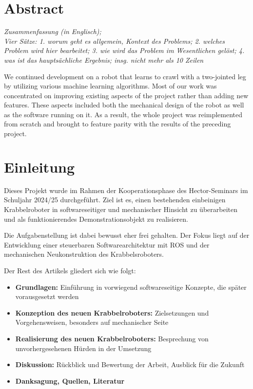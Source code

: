 \section*{Abstract}

\textit{Zusammenfassung (in Englisch); \\ Vier Sätze: 1. worum geht es allgemein, Kontext des Problems; 2. welches Problem wird hier bearbeitet; 3. wie wird das Problem im Wesentlichen gelöst; 4. was ist das hauptsächliche Ergebnis; insg. nicht mehr als 10 Zeilen}

We continued development on a robot that learns to crawl with a two-jointed leg by utilizing various machine learning algorithms. Most of our work was concentrated on improving existing aspects of the project rather than adding new features. These aspects included both the mechanical design of the robot as well as the software running on it. As a result, the whole project was reimplemented from scratch and brought to feature parity with the results of the preceding project.

\section{Einleitung}

Dieses Projekt wurde im Rahmen der Kooperationsphase des Hector-Seminars im Schuljahr 2024/25 durchgeführt. 
Ziel ist es, einen bestehenden einbeinigen Krabbelroboter in softwareseitiger und mechanischer Hinsicht zu überarbeiten und als funktionierendes Demonstrationsobjekt zu realisieren.

Die Aufgabenstellung ist dabei bewusst eher frei gehalten. Der Fokus liegt auf der Entwicklung einer steuerbaren Softwarearchitektur mit ROS und der mechanischen Neukonstruktion des Krabbelsroboters.

Der Rest des Artikels gliedert sich wie folgt:

\begin{itemize}
	\item \textbf{Grundlagen:} Einführung in vorwiegend softwareseitige Konzepte, die später vorausgesetzt werden
	\item \textbf{Konzeption des neuen Krabbelroboters:} Zielsetzungen und Vorgehensweisen, besonders auf mechanischer Seite
	\item \textbf{Realisierung des neuen Krabbelroboters:} Besprechung von unvorhergesehenen Hürden in der Umsetzung
	\item \textbf{Diskussion:} Rückblick und Bewertung der Arbeit, Ausblick für die Zukunft
	\item \textbf{Danksagung, Quellen, Literatur}
\end{itemize}

